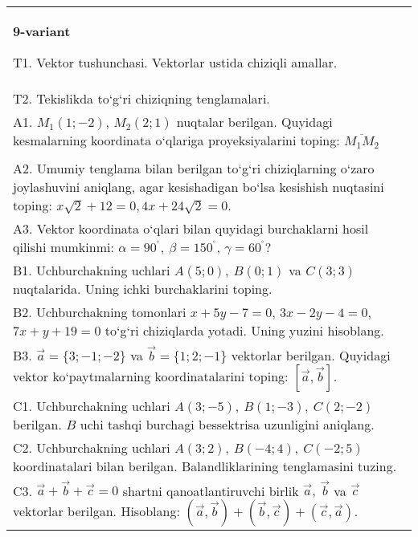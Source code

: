 \documentclass{article}
\begin{document}
\begin{tabular}{m{17cm}}
\textbf{9-variant}
\newline

T1. 
Vektor tushunchasi. Vektorlar ustida chiziqli amallar.
 \\
T2. 
Tekislikda to‘g‘ri chiziqning tenglamalari.
 \\
A1. $M_1 (1; -2) $, $M_2 (2; 1) $ nuqtalar berilgan.
Quyidagi kesmalarning koordinata o‘qlariga proyeksiyalarini toping: $\overline{M_1M_2}$ \\
 \\
A2. 
Umumiy tenglama bilan berilgan to‘g‘ri chiziqlarning
o‘zaro joylashuvini aniqlang, agar kesishadigan bo‘lsa kesishish nuqtasini
toping: $x\sqrt{2}+12=0, 4x+24\sqrt{2}=0$.
 \\
A3. 
Vektor koordinata o‘qlari bilan quyidagi burchaklarni hosil qilishi
mumkinmi: $\alpha = 90^{{^\circ}},\ \beta = 150^{{^\circ}}$,
$\gamma = 60^{{^\circ}}?$
 \\
B1. 
Uchburchakning uchlari \(A (5;0),\ B (0;1) \) va \(C (3;3) \)
nuqtalarida. Uning ichki burchaklarini toping.
 \\
B2. 
Uchburchakning tomonlari \(x+5y-7=0\),
\(3x-2y-4=0\), \(7x+y+19=0\) to‘g‘ri chiziqlarda yotadi. Uning
yuzini hisoblang.
 \\
B3. 
$\vec{a} = \{ 3; - 1; - 2\}$ va $\vec{b} = \{ 1;2; - 1\}$ vektorlar berilgan. Quyidagi vektor ko‘paytmalarning koordinatalarini toping:
$\left\lbrack \vec{a},\vec{b} \right\rbrack$.
 \\
C1. 
Uchburchakning uchlari
\(A (3; - 5),\ B (1; - 3),\ C (2; - 2) \) berilgan. $B$ uchi tashqi
burchagi bessektrisa uzunligini aniqlang.
 \\
C2. 
Uchburchakning uchlari
\(A (3;2),\ B (- 4;4),\ C (- 2; 5) \) koordinatalari bilan berilgan.
Balandliklarining tenglamasini tuzing.
 \\
C3. \(\vec{a} + \vec{b} + \vec{c} = 0\) shartni qanoatlantiruvchi birlik \(\vec{a},\ \vec{b}\) va \(\vec{c}\) vektorlar berilgan. Hisoblang: \(\left(\vec{a},\vec{b} \right) + \left(\vec{b},\vec{c} \right) + \left(\vec{c},\vec{a} \right) \).
 \\

\end{tabular}
\vspace{1cm}
\end{document}
